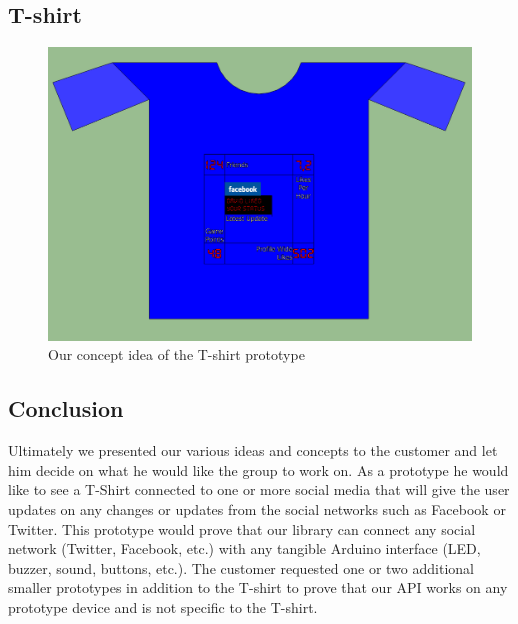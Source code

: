 \subsection{T-shirt}

\begin{figure}[h!]
\centering \includegraphics[scale=0.35]{img/prestudies-tshirt} \caption{Our concept idea of the T-shirt prototype}

\label{fig:prestudies-tshirt}
\end{figure}

\subsection{Conclusion}
Ultimately we presented our various ideas and concepts to the customer and let him decide on what he would
like the group to work on. As a prototype he would like to see a T-Shirt connected to one or more social media
that will give the user updates on any changes or updates from the social networks such as Facebook or Twitter.
This prototype would prove that our library can connect any social network (Twitter, Facebook, etc.) with any
tangible Arduino interface (LED, buzzer, sound, buttons, etc.). The customer requested one or two additional
smaller prototypes in addition to the T-shirt to prove that our API works on any prototype device and is not
specific to the T-shirt.
